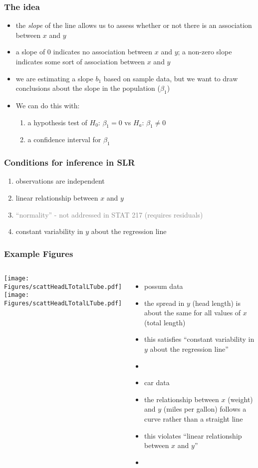 \begin{frame}
\frametitle{The idea}
\begin{itemize}
\item
the \emph{slope} of the line allows us to assess whether or not there is an association between $x$ and $y$
\item
a slope of 0 indicates no association between $x$ and $y$; a non-zero slope indicates some sort of association between $x$ and $y$
\item
we are estimating a slope $b_1$ based on sample data, but we want to draw conclusions about the slope in the population ($\beta_1$)
\item
We can do this with:
\begin{enumerate}
    \item
    a hypothesis test of $H_0$: $\beta_1=0$ vs $H_a$: $\beta_1 \neq 0$
    \item
    a confidence interval for $\beta_1$
\end{enumerate}
\end{itemize}
\end{frame}

\begin{frame}
\frametitle{Conditions for inference in SLR}
\begin{enumerate}
    \item
    observations are independent
    \item
    linear relationship between $x$ and $y$
    \item
    \textcolor{gray}{``normality'' - not addressed in STAT 217 (requires residuals)}
    \item
    constant variability in $y$ about the regression line
\end{enumerate}
\end{frame}


\begin{frame}
\frametitle{Example Figures}
\begin{columns}
\texttt{[image: Figures/scattHeadLTotalLTube.pdf]}\\
\vskip5pt
\texttt{[image: Figures/scattHeadLTotalLTube.pdf]}
\begin{itemize}
    \item
    possum data
    \item
    the spread in $y$ (head length) is about the same for all values of $x$ (total length)
    \item
    this satisfies ``constant variability in $y$ about the regression line''
    \item[]
    \item
    car data
    \item
    the relationship between $x$ (weight) and $y$ (miles per gallon) follows a curve rather than a straight line
    \item
    this violates ``linear relationship between $x$ and $y$''
    \item[]
\end{itemize}
\end{columns}
\end{frame}

